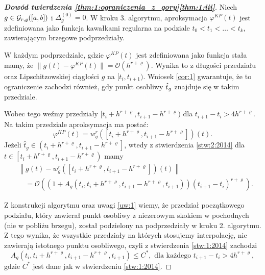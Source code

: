 \documentclass[oik, pdftex, man]{mgrwms}
\begin{document}
    \begin{proof}[\textbf{Dowód twierdzenia \ref{thm:1:ograniczenia_z_gory}\ref{thm:1:iii}}]
        Niech $g \in \mathcal{G}_{r,\varrho}([a,b])$ i $\Delta_{g}^{(0)} = 0$. W kroku 3. algorytmu, aproksymacja $\varphi^{KP}(t)$ jest zdefiniowana jako funkcja kawałkami regularna na podziale $t_{0} < t_{1} < \ldots < t_{k}$, zawierającym brzegowe podprzedziały.
        
        W każdym podprzedziale, gdzie $\varphi^{KP}(t)$ jest zdefiniowana jako funkcja stała mamy, że $\|g(t) - \varphi^{KP}(t)\| = \mathcal{O}(h^{r+\varrho})$. Wynika to z długości przedziału oraz Lipschitzowskiej ciągłości $g$ na $[t_{i}, t_{i+1})$. Wniosek \ref{cor:1} gwarantuje, że to ograniczenie zachodzi również, gdy punkt osobliwy $\hat{t}_{g}$ znajduje się w takim przedziale.

        Wobec tego weźmy przedziały $[t_{i} + h^{r+\varrho}, t_{i+1} - h^{r+\varrho})$ dla $t_{i+1}-t_{i} > 4h^{r+\varrho}$. Na takim przedziale aproksymacja ma postać:
        \begin{equation*}
            \varphi^{KP}(t)=w_{g}^{r}\left(\left[t_{i}+h^{r+\varrho}, t_{i+1}-h^{r+\varrho}\right]\right)(t).
        \end{equation*}
        Jeżeli $\hat{t}_{g} \in\left(t_{i}+h^{r+\varrho}, t_{i+1}-h^{r+\varrho}\right]$, wtedy z stwierdzenia \ref{stw:2:2014} dla $t \in\left[t_{i}+h^{r+\varrho}, t_{i+1}-h^{r+\varrho}\right)$ mamy
        \begin{equation*}
            \begin{aligned}
                &\left\|g(t)-w_{g}^{r}\left(\left[t_{i}+h^{r+\varrho}, t_{i+1}-h^{r+\varrho}\right]\right)(t)\right\| \\
                &\quad=\mathcal{O}\left(\left(1+A_{g}\left(t_{i}, t_{i}+h^{r+\varrho}, t_{i+1}-h^{r+\varrho}, t_{i+1}\right)\right)\left(t_{i+1}-t_{i}\right)^{r+\varrho}\right).
            \end{aligned}                            
        \end{equation*}

        Z konstrukcji algorytmu oraz uwagi \ref{uw:1} wiemy, że przedział początkowego podziału, który zawierał punkt osobliwy z niezerowym skokiem w pochodnych (nie w pobliżu brzegu), został podzielony na podprzedziały w kroku 2. algorytmu. Z tego wynika, że wszystkie przedziały na których stosujemy interpolację, nie zawierają istotnego punktu osobliwego, czyli z stwierdzenia \ref{stw:1:2014} zachodzi
        \begin{equation*}
            A_{g}\left(t_{i}, t_{i}+h^{r+\varrho}, t_{i+1}-h^{r+\varrho}, t_{i+1}\right) \leq C^{*}, \text{ dla każdego } t_{i+1} - t_{i} > 4h^{r+\varrho},
        \end{equation*}
        gdzie $C^{*}$ jest dane jak w stwierdzeniu \ref{stw:1:2014}.


\end{proof}
\end{document}
